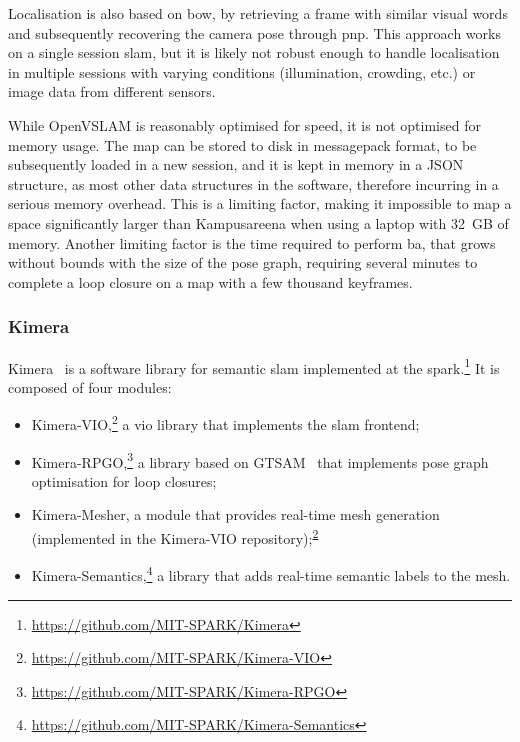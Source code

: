 \documentclass[11pt, letterpaper, twoside]{article}
\begin{document}
Localisation is also based on \gls{bow}, by retrieving a frame with similar
visual words and subsequently recovering the camera pose through \gls{pnp}.
This approach works on a single session \gls{slam}, but it is likely not robust
enough to handle localisation in multiple sessions with varying conditions
(illumination, crowding, etc.) or image data from different sensors.

While OpenVSLAM is reasonably optimised for speed, it is not optimised for
memory usage. The map can be stored to disk in messagepack format, to be
subsequently loaded in a new session, and it is kept in memory in a JSON
structure, as most other data structures in the software, therefore incurring
in a serious memory overhead. This is a limiting factor, making it impossible
to map a space significantly larger than Kampusareena when using a laptop with
32~GB of memory. Another limiting factor is the time required to perform
\gls{ba}, that grows without bounds with the size of the pose graph, requiring
several minutes to complete a loop closure on a map with a few thousand
keyframes.

\subsubsection{Kimera}

Kimera~\cite{rosinol2019kimera} is a software library for semantic \gls{slam}
implemented at the
\gls{spark}.\footnote{\url{https://github.com/MIT-SPARK/Kimera}} It is composed
of four modules:
\begin{itemize}
    \item
        Kimera-VIO,\footnote{\label{note:kimera_vio}\url{https://github.com/MIT-SPARK/Kimera-VIO}} a
        \gls{vio} library that implements the \gls{slam} frontend;
    \item
        Kimera-RPGO,\footnote{\url{https://github.com/MIT-SPARK/Kimera-RPGO}}
        a library based on GTSAM~\cite{dellaert2006square,dellaert2012factor}
        that implements pose graph optimisation for loop closures;
    \item
        Kimera-Mesher, a module that provides real-time mesh generation
        (implemented in the Kimera-VIO
        repository);\textsuperscript{\ref{note:kimera_vio}}
    \item
        Kimera-Semantics,\footnote{\url{https://github.com/MIT-SPARK/Kimera-Semantics}}
        a library that adds real-time semantic labels to the mesh.
\end{itemize}
\end{document}
